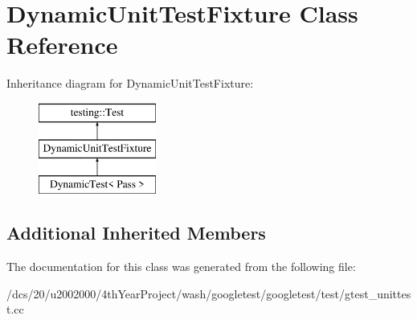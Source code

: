 \hypertarget{classDynamicUnitTestFixture}{}\section{Dynamic\+Unit\+Test\+Fixture Class Reference}
\label{classDynamicUnitTestFixture}
Inheritance diagram for Dynamic\+Unit\+Test\+Fixture\+:\begin{figure}[H]
\begin{center}
\leavevmode
\includegraphics[height=3.000000cm]{classDynamicUnitTestFixture}
\end{center}
\end{figure}
\subsection*{Additional Inherited Members}


The documentation for this class was generated from the following file\+:\begin{DoxyCompactItemize}
\item 
/dcs/20/u2002000/4th\+Year\+Project/wash/googletest/googletest/test/gtest\+\_\+unittest.\+cc\end{DoxyCompactItemize}
